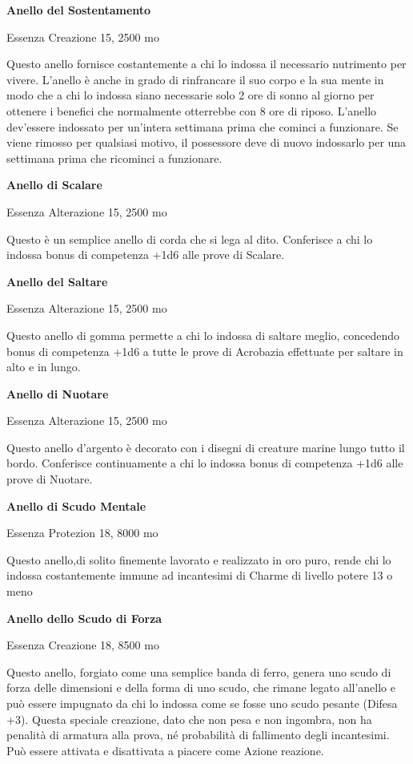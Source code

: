 \documentclass[a4paper,11pt,twoside,openany]{book}
\begin{document}
\textbf{Anello del Sostentamento}

Essenza Creazione 15, 2500 mo

Questo anello fornisce costantemente a chi lo indossa il necessario nutrimento per vivere. L'anello è anche in grado di rinfrancare il suo corpo e la sua mente in modo che a chi lo indossa siano necessarie solo 2 ore di sonno al giorno per ottenere i benefici che normalmente otterrebbe con 8 ore di riposo. L'anello dev'essere indossato per un'intera settimana prima che cominci a funzionare. Se viene rimosso per qualsiasi motivo, il possessore deve di nuovo indossarlo per una settimana prima che ricominci a funzionare.

\textbf{Anello di Scalare}

Essenza Alterazione 15, 2500 mo

Questo è un semplice anello di corda che si lega al dito. Conferisce a chi lo indossa bonus di competenza +1d6 alle prove di Scalare.

\textbf{Anello del Saltare}

Essenza Alterazione 15, 2500 mo

Questo anello di gomma permette a chi lo indossa di saltare meglio, concedendo bonus di competenza +1d6 a tutte le prove di Acrobazia effettuate per saltare in alto e in lungo.

\textbf{Anello di Nuotare}

Essenza Alterazione 15, 2500 mo

Questo anello d'argento è decorato con i disegni di creature marine lungo tutto il bordo. Conferisce continuamente a chi lo indossa bonus di competenza +1d6 alle prove di Nuotare.

\textbf{Anello di Scudo Mentale}

Essenza Protezion 18, 8000 mo

Questo anello,di solito finemente lavorato e realizzato in oro puro, rende chi lo indossa costantemente immune ad incantesimi di Charme di livello potere 13 o meno

\textbf{Anello dello Scudo di Forza}

Essenza Creazione 18, 8500 mo

Questo anello, forgiato come una semplice banda di ferro, genera uno scudo di forza delle dimensioni e della forma di uno scudo, che rimane legato all'anello e può essere impugnato da chi lo indossa come se fosse uno scudo pesante (Difesa +3). Questa speciale creazione, dato che non pesa e non ingombra, non ha penalità di armatura alla prova, né probabilità di fallimento degli incantesimi. Può essere attivata e disattivata a piacere come Azione reazione.
\end{document}
